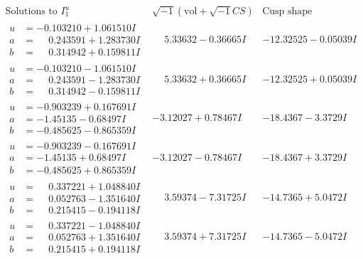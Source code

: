 \documentclass[1p]{elsarticle_modified}
\theoremstyle{definition}
\newcommand{\I}{\sqrt{-1}}
\begin{document}
$$\begin{array}{c|c|c}  
\text{Solutions to }I^u_{1}& \I (\text{vol} + \sqrt{-1}CS) & \text{Cusp shape}\\
 \hline 
\begin{aligned}
u &= -0.103210 + 1.061510 I \\
a &= \phantom{-}0.243591 + 1.283730 I \\
b &= \phantom{-}0.314942 + 0.159811 I\end{aligned}
 & \phantom{-}5.33632 - 0.36665 I & -12.32525 - 0.05039 I \\ \hline\begin{aligned}
u &= -0.103210 - 1.061510 I \\
a &= \phantom{-}0.243591 - 1.283730 I \\
b &= \phantom{-}0.314942 - 0.159811 I\end{aligned}
 & \phantom{-}5.33632 + 0.36665 I & -12.32525 + 0.05039 I \\ \hline\begin{aligned}
u &= -0.903239 + 0.167691 I \\
a &= -1.45135 - 0.68497 I \\
b &= -0.485625 - 0.865359 I\end{aligned}
 & -3.12027 + 0.78467 I & -18.4367 - 3.3729 I \\ \hline\begin{aligned}
u &= -0.903239 - 0.167691 I \\
a &= -1.45135 + 0.68497 I \\
b &= -0.485625 + 0.865359 I\end{aligned}
 & -3.12027 - 0.78467 I & -18.4367 + 3.3729 I \\ \hline\begin{aligned}
u &= \phantom{-}0.337221 + 1.048840 I \\
a &= \phantom{-}0.052763 - 1.351640 I \\
b &= \phantom{-}0.215415 - 0.194118 I\end{aligned}
 & \phantom{-}3.59374 - 7.31725 I & -14.7365 + 5.0472 I \\ \hline\begin{aligned}
u &= \phantom{-}0.337221 - 1.048840 I \\
a &= \phantom{-}0.052763 + 1.351640 I \\
b &= \phantom{-}0.215415 + 0.194118 I\end{aligned}
 & \phantom{-}3.59374 + 7.31725 I & -14.7365 - 5.0472 I \\ \hline\begin{aligned}

\end{aligned}
\end{array}$$
\end{document}

